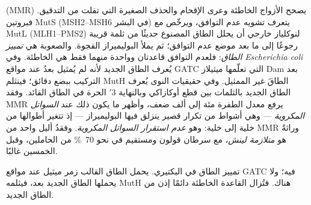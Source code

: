 \begin{definition}\label{def:b3:dna-repair:mmr}
\emph{} (MMR) يصحح الأزواج الخاطئة وعرى الإقحام
والحذف الصغيرة التي تفلت من التدقيق. فبروتين MutS
(MSH2--MSH6 في البشر) يتعرف تشويه عدم التوافق، ويرخّص مع
MutL (MLH1--PMS2) لنوكلياز خارجي أن يحلل الطاق المصنوع
حديثًا من ثلمة قريبة رجوعًا إلى ما بعد موضع عدم التوافق؛ ثم يملأ
البوليميراز الفجوة. والصعوبة هي \emph{تمييز الطاق}: فلعدم التوافق
قاعدتان وواحدة منهما فقط هي الخاطئة. وفي
\emph{Escherichia coli} يُعرف الطاق الجديد لأنه لم
يُمثيل بعدُ عند مواقع GATC التي تعلّمها ميثيلاز Dam بعد التركيب ببضع
دقائق؛ فينثلم MutH الطاقَ غير الممثيل. وفي
حقيقيات النوى يُعرف الطاق الجديد بالثلمات بين قطع أوكازاكي
وبالنهاية 3$'$ الحرة في الطاق القائد. وفقد MMR
يرفع معدل الطفرة مئة إلى ألف ضعف، وأظهر ما يكون ذلك
عند \emph{السواتل المكروية} --- وهي أشواط من تكرار قصير ينزلق فيها
البوليميراز --- إذ تتغير أطوالها من خلية إلى خلية: وهو
\emph{عدم استقرار السواتل المكروية}. وفقدُ أليل واحد من MMR وراثةً هو
\emph{متلازمة لينش}، مع سرطان قولون ومستقيم في نحو \qty{70}{\%} من
الحاملين، وقبل الخمسين غالبًا.
\end{definition}

\begin{omfigure}

{\small تمييز الطاق في  البكتيري. يحمل الطاق القالب
زمر ميثيل عند مواقع GATC فيه؛ ولا يحملها الطاق الجديد بعد، فيثلمه
MutH هناك. فتُزال القاعدة الخاطئة دائمًا إذن من الطاق الجديد.}
\end{omfigure}

